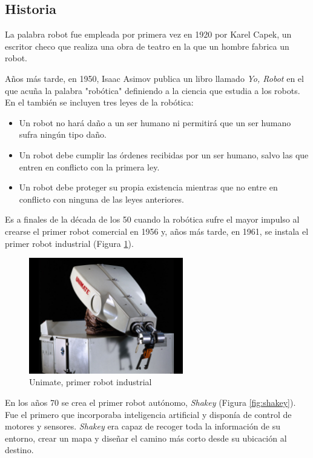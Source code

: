 \subsection{Historia}
La palabra robot fue empleada por primera vez en 1920 por Karel Capek, un escritor checo que realiza una obra de teatro en la que un hombre fabrica un robot. 

Años más tarde, en 1950, Isaac Asimov publica un libro llamado \textit{Yo, Robot} en el que acuña la palabra "robótica" definiendo a la ciencia que estudia a los robots. En el también se incluyen tres leyes de la robótica:
\begin{itemize}
    \item Un robot no hará daño a un ser humano ni permitirá que un ser humano sufra ningún tipo daño.
    \item Un robot debe cumplir las órdenes recibidas por un ser humano, salvo las que entren en conflicto con la primera ley.
    \item Un robot debe proteger su propia existencia mientras que no entre en conflicto con ninguna de las leyes anteriores. 
\end{itemize}{}

Es a finales de la década de los 50 cuando la robótica sufre el mayor impulso al crearse el primer robot comercial en 1956 y, años más tarde, en 1961, se instala el primer robot industrial (Figura \ref{fig:unimate}).  

\begin{figure}[H]
\centering
\includegraphics[width=0.6\textwidth]{img/unimate.jpg}
\caption{Unimate, primer robot industrial} \label{fig:unimate}
\end{figure}

En los años 70 se crea el primer robot autónomo, \textit{Shakey}  (Figura \ref{fig:shakey}). Fue el primero que incorporaba inteligencia artificial y disponía de control de motores y sensores. \textit{Shakey} era capaz de recoger toda la información de su entorno, crear un mapa y diseñar el camino más corto desde su ubicación al destino. 

